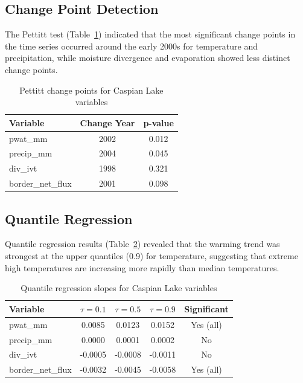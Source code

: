 \documentclass[12pt,a4paper]{article}
\begin{document}
\subsection{Change Point Detection}
The Pettitt test (Table~\ref{tab:pettitt}) indicated that the most significant change points in the time series occurred around the early 2000s for temperature and precipitation, while moisture divergence and evaporation showed less distinct change points.

\begin{table}[H]
\centering
\caption{Pettitt change points for Caspian Lake variables}
\label{tab:pettitt}
\begin{tabular}{lcc}
\toprule
\textbf{Variable} & \textbf{Change Year} & \textbf{p-value} \\
\midrule
pwat\_mm & 2002 & 0.012 \\
precip\_mm & 2004 & 0.045 \\
div\_ivt & 1998 & 0.321 \\
border\_net\_flux & 2001 & 0.098 \\
\bottomrule
\end{tabular}
\end{table}

\subsection{Quantile Regression}
Quantile regression results (Table~\ref{tab:quantile}) revealed that the warming trend was strongest at the upper quantiles (0.9) for temperature, suggesting that extreme high temperatures are increasing more rapidly than median temperatures.

\begin{table}[H]
\centering
\caption{Quantile regression slopes for Caspian Lake variables}
\label{tab:quantile}
\begin{tabular}{lcccc}
\toprule
\textbf{Variable} & \textbf{$\tau=0.1$} & \textbf{$\tau=0.5$} & \textbf{$\tau=0.9$} & \textbf{Significant} \\
\midrule
pwat\_mm & 0.0085 & 0.0123 & 0.0152 & Yes (all) \\
precip\_mm & 0.0000 & 0.0001 & 0.0002 & No \\
div\_ivt & -0.0005 & -0.0008 & -0.0011 & No \\
border\_net\_flux & -0.0032 & -0.0045 & -0.0058 & Yes (all) \\
\bottomrule
\end{tabular}
\end{table}
\end{document}
